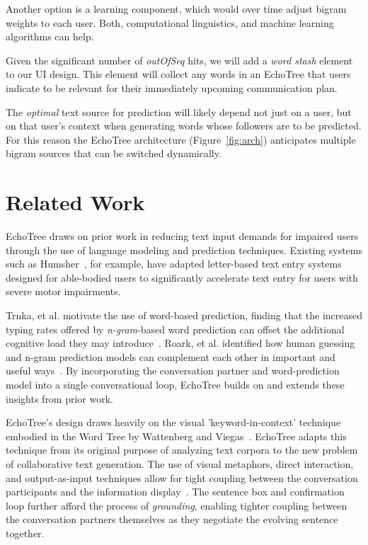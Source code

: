 \documentclass{sigchi}
\begin{document}
Another option is a learning component, which would over time adjust
bigram weights to each user. Both, computational linguistics, and
machine learning algorithms can help.

Given the significant number of {\em outOfSeq} hits, we will add
a {\em word stash} element to our UI design. This element will collect
any words in an EchoTree that users indicate to be relevant for their
immediately upcoming communication plan.

The {\em optimal} text source for prediction will likely depend not just on
a user, but on that user's context when generating words whose
followers are to be predicted. For this reason the EchoTree
architecture (Figure~\ref{fig:arch}) anticipates multiple bigram
sources that can be switched dynamically.

\section{Related Work}
EchoTree draws on prior work in reducing text input demands for
impaired users through the use of language modeling and prediction
techniques. Existing systems such as Humsher~\cite{Polacek2011}, for
example, have adapted letter-based text entry systems designed for
able-bodied users to significantly accelerate text entry for users
with severe motor impairments.

Trnka, et al. motivate the use of word-based prediction, finding that
the increased typing rates offered by {\em n-gram}-based word
prediction can offset the additional cognitive load they may
introduce~\cite{Trnka2009}. Roark, et al. identified how human
guessing and n-gram prediction models can complement each other in
important and useful ways~\cite{Roark2011}. By incorporating the
conversation partner and word-prediction model into a single
conversational loop, EchoTree builds on and extends these insights
from prior work.

EchoTree's design draws heavily on the visual 'keyword-in-context'
technique embodied in the Word Tree by Wattenberg and
Viegas~\cite{wattenberg2008}. EchoTree adapts this technique from its
original purpose of analyzing text corpora to the new problem of
collaborative text generation. The use of visual metaphors, direct
interaction, and output-as-input techniques allow for tight coupling
between the conversation participants and the information
display~\cite{Ahlberg1994}. The sentence box and confirmation loop
further afford the process of {\em grounding}, enabling tighter
coupling between the conversation partners themselves as they
negotiate the evolving sentence together.
\end{document}
